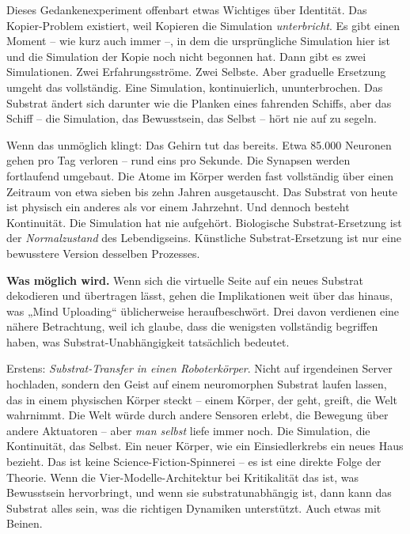 \documentclass[11pt, twoside, openright]{book}
\begin{document}
Dieses Gedankenexperiment offenbart etwas Wichtiges über Identität. Das Kopier-Problem existiert, weil Kopieren die Simulation \textit{unterbricht}. Es gibt einen Moment -- wie kurz auch immer --, in dem die ursprüngliche Simulation hier ist und die Simulation der Kopie noch nicht begonnen hat. Dann gibt es zwei Simulationen. Zwei Erfahrungsströme. Zwei Selbste. Aber graduelle Ersetzung umgeht das vollständig. Eine Simulation, kontinuierlich, ununterbrochen. Das Substrat ändert sich darunter wie die Planken eines fahrenden Schiffs, aber das Schiff -- die Simulation, das Bewusstsein, das Selbst -- hört nie auf zu segeln.

Wenn das unmöglich klingt: Das Gehirn tut das bereits. Etwa 85.000 Neuronen gehen pro Tag verloren -- rund eins pro Sekunde. Die Synapsen werden fortlaufend umgebaut. Die Atome im Körper werden fast vollständig über einen Zeitraum von etwa sieben bis zehn Jahren ausgetauscht. Das Substrat von heute ist physisch ein anderes als vor einem Jahrzehnt. Und dennoch besteht Kontinuität. Die Simulation hat nie aufgehört. Biologische Substrat-Ersetzung ist der \textit{Normalzustand} des Lebendigseins. Künstliche Substrat-Ersetzung ist nur eine bewusstere Version desselben Prozesses.

\textbf{Was möglich wird.} Wenn sich die virtuelle Seite auf ein neues Substrat dekodieren und übertragen lässt, gehen die Implikationen weit über das hinaus, was „Mind Uploading“ üblicherweise heraufbeschwört. Drei davon verdienen eine nähere Betrachtung, weil ich glaube, dass die wenigsten vollständig begriffen haben, was Substrat-Unabhängigkeit tatsächlich bedeutet.

Erstens: \textit{Substrat-Transfer in einen Roboterkörper}. Nicht auf irgendeinen Server hochladen, sondern den Geist auf einem neuromorphen Substrat laufen lassen, das in einem physischen Körper steckt -- einem Körper, der geht, greift, die Welt wahrnimmt. Die Welt würde durch andere Sensoren erlebt, die Bewegung über andere Aktuatoren -- aber \textit{man selbst} liefe immer noch. Die Simulation, die Kontinuität, das Selbst. Ein neuer Körper, wie ein Einsiedlerkrebs ein neues Haus bezieht. Das ist keine Science-Fiction-Spinnerei -- es ist eine direkte Folge der Theorie. Wenn die Vier-Modelle-Architektur bei Kritikalität das ist, was Bewusstsein hervorbringt, und wenn sie substratunabhängig ist, dann kann das Substrat alles sein, was die richtigen Dynamiken unterstützt. Auch etwas mit Beinen.
\end{document}
